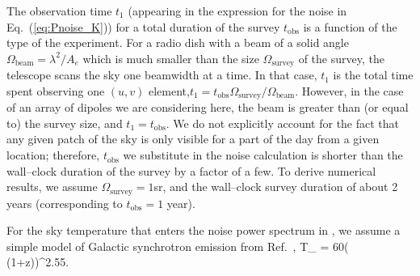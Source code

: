 The observation time $t_1$ (appearing in the expression for the noise in Eq.~(\ref{eq:Pnoise_K})) for a total duration of the survey  $t_\text{obs}$ is a function of the type of the experiment.  For a radio dish with a beam of a solid angle $\Omega_\text{beam}=\lambda^2/A_e$ which is much smaller than the size $\Omega_\text{survey}$ of the survey, the telescope scans the sky one beamwidth at a time. In that case, $t_1$ is the total time spent observing one $(u,v)$ element,$t_1=t_\text{obs}\Omega_\text{survey}/\Omega_\text{beam}$. However, in the case of an array of dipoles we are considering here, the beam is greater than (or equal to) the survey size, and $t_1=t_\text{obs}$. We do not explicitly account for the fact that any given patch of the sky is only visible for a part of the day from a given location; therefore, $t_\text{obs}$ we substitute in the noise calculation is shorter than the wall--clock duration of the survey by a factor of a few. To derive numerical results, we assume $\Omega_\text{survey}=1$sr, and the wall--clock survey duration of about 2 years (corresponding to $t_\text{obs}=1$ year). 

For the sky temperature that enters the noise power spectrum in \eq{\ref{eq:Pnoise_K}}, we assume a simple model of Galactic synchrotron emission from Ref.~\cite{2008PhRvD..78b3529M}, 
\beq
T_  = 60\left( (1+z)\right)^{2.55}\text{   [K]}.
\label{eq:tsys}
\eeq

